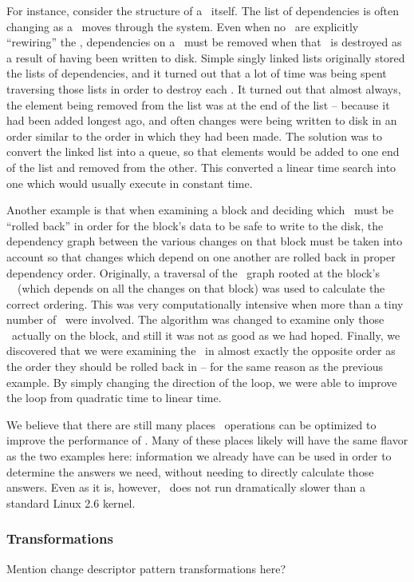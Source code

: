 For instance, consider the structure of a \chdesc\ itself. The list of
dependencies is often changing as a \chdesc\ moves through the system. Even
when no \modules\ are explicitly ``rewiring'' the \chdescs, dependencies on a
\chdesc\ must be removed when that \chdesc\ is destroyed as a result of having
been written to disk. Simple singly linked lists originally stored the lists of
dependencies, and it turned out that a lot of time was being spent traversing
those lists in order to destroy each \chdesc. It turned out that almost always,
the element being removed from the list was at the end of the list -- because
it had been added longest ago, and often changes were being written to disk in
an order similar to the order in which they had been made. The solution was to
convert the linked list into a queue, so that elements would be added to one
end of the list and removed from the other. This converted a linear time search
into one which would usually execute in constant time.

Another example is that when examining a block and deciding which \chdescs\
must be ``rolled back'' in order for the block's data to be safe to write to
the disk, the dependency graph between the various changes on that block must
be taken into account so that changes which depend on one another are rolled
back in proper dependency order. Originally, a traversal of the \chdesc\ graph
rooted at the block's \noop\ \chdesc\ (which depends on all the changes on that
block) was used to calculate the correct ordering. This was very
computationally intensive when more than a tiny number of \chdescs\ were
involved. The algorithm was changed to examine only those \chdescs\ actually on
the block, and still it was not as good as we had hoped. Finally, we discovered
that we were examining the \chdescs\ in almost exactly the opposite order as
the order they should be rolled back in -- for the same reason as the previous
example. By simply changing the direction of the loop, we were able to improve
the loop from quadratic time to linear time.

We believe that there are still many places \chdesc\ operations can be
optimized to improve the performance of \Kudos. Many of these places likely
will have the same flavor as the two examples here: information we already have
can be used in order to determine the answers we need, without needing to
directly calculate those answers. Even as it is, however, \Kudos\ does not run
dramatically slower than a standard Linux 2.6 kernel.

\subsubsection {Transformations}
Mention change descriptor pattern transformations here?

